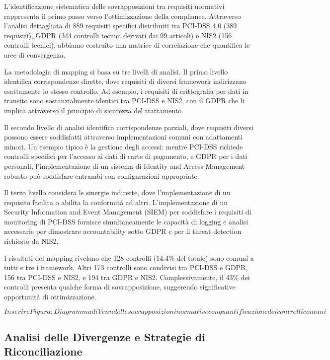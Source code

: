 L'identificazione sistematica delle sovrapposizioni tra requisiti normativi rappresenta il primo passo verso l'ottimizzazione della compliance. Attraverso l'analisi dettagliata di 889 requisiti specifici distribuiti tra PCI-DSS 4.0 (389 requisiti), GDPR (344 controlli tecnici derivati dai 99 articoli) e NIS2 (156 controlli tecnici), abbiamo costruito una matrice di correlazione che quantifica le aree di convergenza.

La metodologia di mapping si basa su tre livelli di analisi. Il primo livello identifica corrispondenze dirette, dove requisiti di diversi framework indirizzano esattamente lo stesso controllo. Ad esempio, i requisiti di crittografia per dati in transito sono sostanzialmente identici tra PCI-DSS e NIS2, con il GDPR che li implica attraverso il principio di sicurezza del trattamento.

Il secondo livello di analisi identifica corrispondenze parziali, dove requisiti diversi possono essere soddisfatti attraverso implementazioni comuni con adattamenti minori. Un esempio tipico è la gestione degli accessi: mentre PCI-DSS richiede controlli specifici per l'accesso ai dati di carte di pagamento, e GDPR per i dati personali, l'implementazione di un sistema di Identity and Access Management robusto può soddisfare entrambi con configurazioni appropriate.

Il terzo livello considera le sinergie indirette, dove l'implementazione di un requisito facilita o abilita la conformità ad altri. L'implementazione di un Security Information and Event Management (SIEM) per soddisfare i requisiti di monitoring di PCI-DSS fornisce simultaneamente le capacità di logging e analisi necessarie per dimostrare accountability sotto GDPR e per il threat detection richiesto da NIS2.

I risultati del mapping rivelano che 128 controlli (14.4\% del totale) sono comuni a tutti e tre i framework. Altri 173 controlli sono condivisi tra PCI-DSS e GDPR, 156 tra PCI-DSS e NIS2, e 194 tra GDPR e NIS2. Complessivamente, il 43\% dei controlli presenta qualche forma di sovrapposizione, suggerendo significative opportunità di ottimizzazione.

\[Inserire Figura: Diagramma di Venn delle sovrapposizioni normative con quantificazione dei controlli comuni\]

\subsection{Analisi delle Divergenze e Strategie di Riconciliazione}

